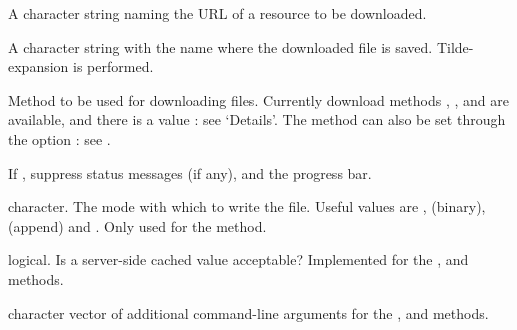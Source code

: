 \begin{Arguments}
\begin{ldescription}
\item[\code{url}] A character string naming the URL of a resource to be
downloaded.

\item[\code{destfile}] A character string with the name where the downloaded
file is saved.  Tilde-expansion is performed.

\item[\code{method}] Method to be used for downloading files.  Currently
download methods , , 
and  are available, and there is a value : see
`Details'.  The method can also be set through the option
: see .

\item[\code{quiet}] If , suppress status messages (if any), and
the progress bar.

\item[\code{mode}] character.  The mode with which to write the file.  Useful
values are ,  (binary),  (append) and
.  Only used for the  method.


\item[\code{cacheOK}] logical.  Is a server-side cached value acceptable?
Implemented for the ,  and
 methods.

\item[\code{extra}] character vector of additional command-line arguments for
the ,  and  methods.
\end{ldescription}
\end{Arguments}
%

